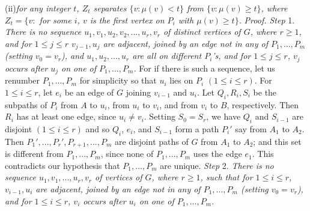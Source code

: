 \hspace*{12pt}(ii)\enspace\textit{for any integer $t$, $Z_t$ separates $\{v\colon\mu(v)<t\}$ from $\{v\colon\mu(v)\ge t\}$,
where $Z_t=\{v\colon$ for some $i$, $v$ is the first vertex on $P_i$ with $\mu(v)\ge t\}$.}
\stmt
\textit{Proof. Step} 1. \textit{There is no sequence $u_1, v_1, u_2, v_2,..., u_r, v_r$ of distinct
vertices of $G$, where $r\ge 1$, and for $1\le j\le r$ $v_{j-1}, u_j$ are adjacent, joined by
an edge not in any of $P_1,..., P_m$ (setting $v_0=v_r$), and $u_1, u_2,..., u_r$ are all on
different $P_i$'s, and for $1\le j\le r$, $v_j$ occurs after $u_j$ on one of $P_1,..., P_m$.}
\stmt
For if there is such a sequence, let us renumber $P_1,..., P_m$ for simplicity so
that $u_i$ lies on $P_i$ $(1\le i\le r)$. For $1\le i\le r$, let $e_i$ be an edge of $G$ joining $v_{i-1}$
and $u_i$. Let $Q_i, R_i, S_i$ be the subpaths of $P_i$ from $A$ to $u_i$, from $u_i$ to $v_i$, and
from $v_i$ to $B$, respectively. Then $R_i$ has at least one edge, since $u_i\ne v_i$.
Setting $S_0=S_r$, we have $Q_i$ and $S_{i-1}$ are disjoint $(1\le i\le r)$ and so $Q_i$, $e_i$,
and $S_{i-1}$ form a path $P_i'$ say from $A_1$ to $A_2$. Then $P_1',..., P_r', P_{r+1},..., P_m$ are
disjoint paths of $G$ from $A_1$ to $A_2$; and this set is different from $P_1,..., P_m$,
since none of $P_1,..., P_m$ uses the edge $e_1$. This contradicts our hypothesis that
$P_1,..., P_m$ are unique.
\stmt
\textit{Step} 2. \textit{There is no sequence $u_1, v_1,..., u_r, v_r$ of vertices of $G$, where
$r\ge 1$, such that for $1\le i\le r$, $v_{i-1}, u_i$ are adjacent, joined by an edge not in
any of $P_1,..., P_m$ (setting $v_0=v_r$), and for $1\le i\le r$, $v_i$ occurs after $u_i$ on one
of $P_1,..., P_m$.}
